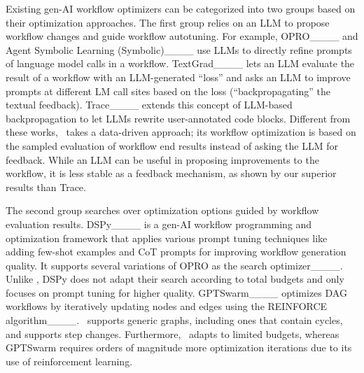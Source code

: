 Existing gen-AI workflow optimizers can be categorized into two groups based on their optimization approaches.
The first group relies on an LLM to propose workflow changes and guide workflow autotuning.
For example, OPRO____ and Agent Symbolic Learning (Symbolic)____ use LLMs to directly refine prompts of language model calls in a workflow. TextGrad____ lets an LLM evaluate the result of a workflow with an LLM-generated ``loss'' and asks an LLM to improve prompts at different LM call sites based on the loss (``backpropagating'' the textual feedback). Trace____ extends this concept of LLM-based backpropagation to let LLMs rewrite user-annotated code blocks. Different from these works, \sysname\ takes a data-driven approach; its workflow optimization is based on the sampled evaluation of workflow end results instead of asking the LLM for feedback. While an LLM can be useful in proposing improvements to the workflow, it is less stable as a feedback mechanism, as shown by our superior results than Trace. 

The second group searches over optimization options guided by workflow evaluation results.
DSPy____ is a gen-AI workflow programming and optimization framework that applies various prompt tuning techniques like adding few-shot examples and CoT prompts for improving workflow generation quality. It supports several variations of OPRO as the search optimizer____. Unlike \sysname, DSPy does not adapt their search according to total budgets and only focuses on prompt tuning for higher quality. GPTSwarm____ optimizes DAG workflows by iteratively updating nodes and edges using the REINFORCE algorithm____. \sysname\ supports generic graphs, including ones that contain cycles, and supports step changes. Furthermore, \sysname\ adapts to limited budgets, whereas GPTSwarm requires orders of magnitude more optimization iterations due to its use of reinforcement learning. 

